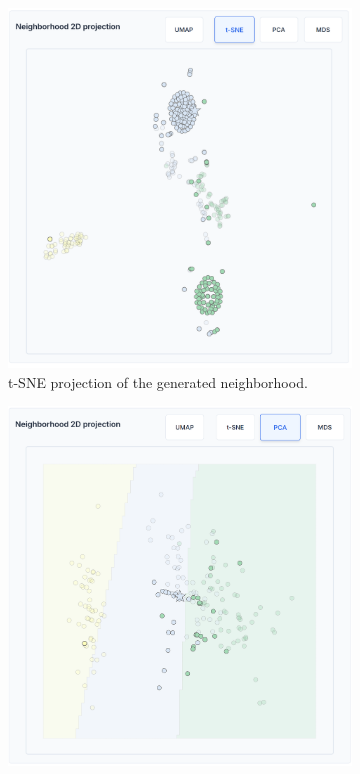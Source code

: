 \begin{figure}[ht]
    \centering
    \begin{subfigure}[c]{0.48\textwidth}
        \includegraphics[width=\textwidth]{images/teaching_scatter_tsne.png}
        \caption{t-SNE projection of the generated neighborhood.}
        \label{fig:teaching_scatter_tsne}
    \end{subfigure}
    \hfill
    \begin{subfigure}[c]{0.48\textwidth}
        \includegraphics[width=\textwidth]{images/teaching_scatter_pca.png}

\end{subfigure}
\end{figure}

